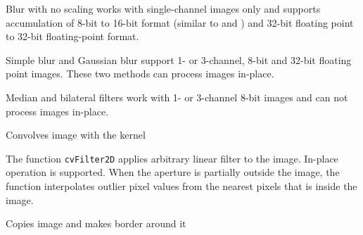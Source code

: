 Blur with no scaling works with single-channel images only and supports accumulation of 8-bit to 16-bit format (similar to  and ) and 32-bit floating point to 32-bit floating-point format.

Simple blur and Gaussian blur support 1- or 3-channel, 8-bit and 32-bit floating point images. These two methods can process images in-place.

Median and bilateral filters work with 1- or 3-channel 8-bit images and can not process images in-place.

\label{Filter2D}

Convolves image with the kernel


\begin{description}
\end{description}

The function \texttt{cvFilter2D} applies arbitrary linear filter to the image. In-place operation is supported. When the aperture is partially outside the image, the function interpolates outlier pixel values from the nearest pixels that is inside the image.

\label{CopyMakeBorder}

Copies image and makes border around it


